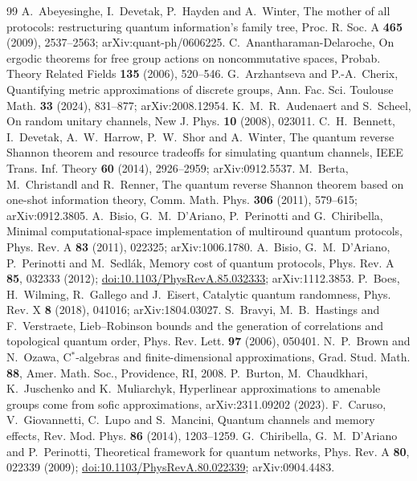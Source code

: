 \documentclass[11pt,a4paper]{article}
\theoremstyle{plain}
\theoremstyle{definition}
\theoremstyle{remark}
\begin{document}
\begin{thebibliography}{99}
 A.~Abeyesinghe, I.~Devetak, P.~Hayden and A.~Winter, The mother of all protocols: restructuring quantum information's family tree, Proc. R. Soc. A \textbf{465} (2009), 2537--2563; arXiv:quant-ph/0606225.
 C.~Anantharaman-Delaroche, On ergodic theorems for free group actions on noncommutative spaces, Probab. Theory Related Fields \textbf{135} (2006), 520--546.
 G.~Arzhantseva and P.-A.~Cherix, Quantifying metric approximations of discrete groups, Ann. Fac. Sci. Toulouse Math. \textbf{33} (2024), 831--877; arXiv:2008.12954.
 K.~M.~R.~Audenaert and S.~Scheel, On random unitary channels, New J. Phys. \textbf{10} (2008), 023011.
 C.~H.~Bennett, I.~Devetak, A.~W.~Harrow, P.~W.~Shor and A.~Winter, The quantum reverse Shannon theorem and resource tradeoffs for simulating quantum channels, IEEE Trans. Inf. Theory \textbf{60} (2014), 2926--2959; arXiv:0912.5537.
 M.~Berta, M.~Christandl and R.~Renner, The quantum reverse Shannon theorem based on one-shot information theory, Comm. Math. Phys. \textbf{306} (2011), 579--615; arXiv:0912.3805.
 A.~Bisio, G.~M.~D'Ariano, P.~Perinotti and G.~Chiribella, Minimal computational-space implementation of multiround quantum protocols, Phys. Rev. A \textbf{83} (2011), 022325; arXiv:1006.1780.
 A.~Bisio, G.~M.~D'Ariano, P.~Perinotti and M.~Sedl\'ak, Memory cost of quantum protocols, Phys. Rev. A \textbf{85}, 032333 (2012); \href{https://doi.org/10.1103/PhysRevA.85.032333}{doi:10.1103/PhysRevA.85.032333}; arXiv:1112.3853.
 P.~Boes, H.~Wilming, R.~Gallego and J.~Eisert, Catalytic quantum randomness, Phys. Rev. X \textbf{8} (2018), 041016; arXiv:1804.03027.
 S.~Bravyi, M.~B.~Hastings and F.~Verstraete, Lieb--Robinson bounds and the generation of correlations and topological quantum
order, Phys. Rev. Lett. \textbf{97} (2006), 050401.
 N.~P.~Brown and N.~Ozawa, C$^*$-algebras and finite-dimensional approximations, Grad. Stud. Math. \textbf{88}, Amer. Math. Soc., Providence, RI, 2008.
 P.~Burton, M.~Chaudkhari, K.~Juschenko and K.~Muliarchyk, Hyperlinear approximations to amenable groups come from sofic approximations, arXiv:2311.09202 (2023).
 F.~Caruso, V.~Giovannetti, C.~Lupo and S.~Mancini, Quantum channels and memory effects, Rev. Mod. Phys. \textbf{86} (2014), 1203--1259.
 G.~Chiribella, G.~M.~D'Ariano and P.~Perinotti, Theoretical framework for quantum networks, Phys. Rev. A \textbf{80}, 022339 (2009); \href{https://doi.org/10.1103/PhysRevA.80.022339}{doi:10.1103/PhysRevA.80.022339}; arXiv:0904.4483.

\end{thebibliography}
\end{document}
